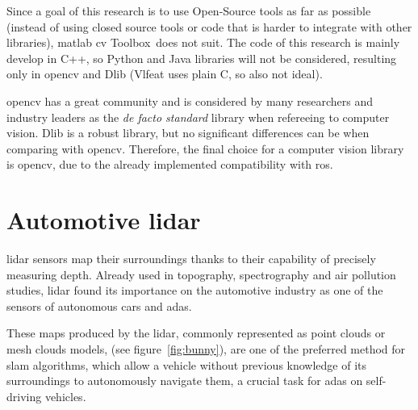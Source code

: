 Since a goal of this research is to use Open-Source tools as far as possible (instead of using closed source tools or code that is harder to integrate with other libraries), \ac{matlab} \acl{cv} Toolbox\texttrademark~does not suit. The code of this research is mainly develop in C++, so Python and Java libraries will not be considered, resulting only in \ac{opencv} and Dlib (Vlfeat uses plain C, so also not ideal). 

\ac{opencv} has a great community and is considered by many researchers and industry leaders as the \textit{de facto standard} library when refereeing to computer vision. Dlib is a robust library, but no significant differences can be when comparing with \ac{opencv}. Therefore, the final choice for a computer vision library is \ac{opencv}, due to the already implemented compatibility with \ac{ros}.




\section{Automotive \ac{lidar}}
\ac{lidar} sensors map their surroundings thanks to their capability of precisely measuring depth. Already used in topography, spectrography and air pollution studies, \ac{lidar} found its importance on the automotive industry as one of the sensors of autonomous cars and \ac{adas}\cite{Sullivan2016}. 

These maps produced by the \ac{lidar}, commonly represented as point clouds or mesh clouds models, (see figure~\ref{fig:bunny}), are one of the preferred method for \ac{slam} algorithms, which allow a vehicle without previous knowledge of its surroundings to autonomously navigate them, a crucial task for \ac{adas} on self-driving vehicles.

